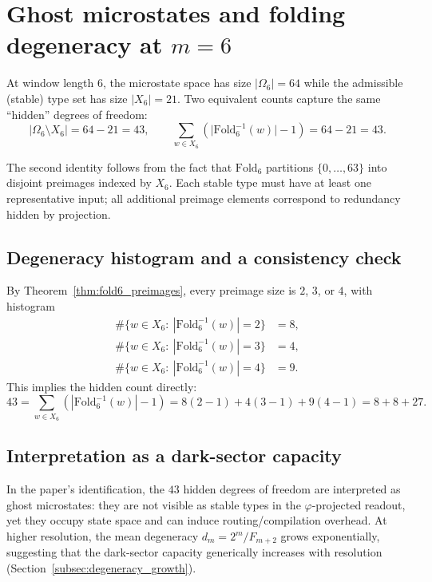 
\section{Ghost microstates and folding degeneracy at \texorpdfstring{$m=6$}{m=6}}
\label{app:ghost_microstates}

At window length $6$, the microstate space has size $|\Omega_6|=64$ while the admissible (stable) type set has size $|X_6|=21$.
Two equivalent counts capture the same ``hidden'' degrees of freedom:
\[
|\Omega_6\setminus X_6|=64-21=43,
\qquad
\sum_{w\in X_6}\left(\bigl|\mathrm{Fold}_6^{-1}(w)\bigr|-1\right)=64-21=43.
\]

The second identity follows from the fact that $\mathrm{Fold}_6$ partitions $\{0,\dots,63\}$ into disjoint preimages indexed by $X_6$.
Each stable type must have at least one representative input; all additional preimage elements correspond to redundancy hidden by projection.

\subsection{Degeneracy histogram and a consistency check}
By Theorem~\ref{thm:fold6_preimages}, every preimage size is $2$, $3$, or $4$, with histogram
\[
\begin{aligned}
\#\{w\in X_6:\ |\mathrm{Fold}_6^{-1}(w)|=2\}&=8,\\
\#\{w\in X_6:\ |\mathrm{Fold}_6^{-1}(w)|=3\}&=4,\\
\#\{w\in X_6:\ |\mathrm{Fold}_6^{-1}(w)|=4\}&=9.
\end{aligned}
\]
This implies the hidden count directly:
\[
43=\sum_{w\in X_6}\left(|\mathrm{Fold}_6^{-1}(w)|-1\right)
=8(2-1)+4(3-1)+9(4-1)=8+8+27.
\]

\subsection{Interpretation as a dark-sector capacity}
In the paper's identification, the $43$ hidden degrees of freedom are interpreted as ghost microstates: they are not visible as stable types in the $\varphi$-projected readout, yet they occupy state space and can induce routing/compilation overhead.
At higher resolution, the mean degeneracy $d_m=2^m/F_{m+2}$ grows exponentially, suggesting that the dark-sector capacity generically increases with resolution (Section~\ref{subsec:degeneracy_growth}).



